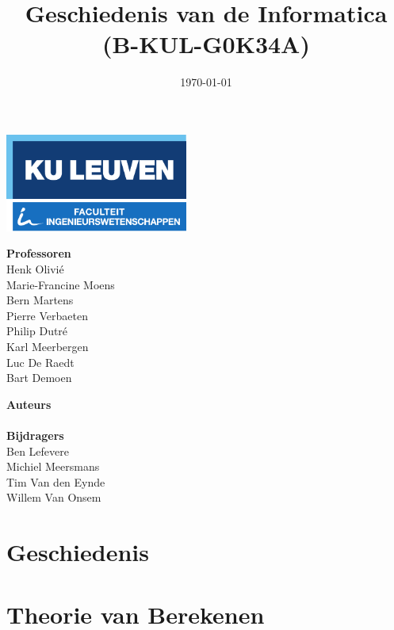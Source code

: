 \documentclass[11pt]{article}
\title{Geschiedenis van de Informatica \\ (B-KUL-G0K34A)}
\date{\today}
\author{\theauthors}
\newcommand{\thecontributors}{Ben Lefevere \\ Michiel Meersmans \\ Tim Van den Eynde \\  Willem Van Onsem }
\newcommand{\theprofs}{Henk Olivi\'e \\ Marie-Francine Moens \\ Bern Martens \\ Pierre Verbaeten \\ Philip Dutr\'e \\ Karl Meerbergen \\ Luc De Raedt \\ Bart Demoen}
\theoremstyle{definition}
\begin{document}

\begin{titlepage}

\thispagestyle{empty}

\begin{minipage}{\textwidth}
	\includegraphics[width=60mm]{logokuleng.pdf}
\end{minipage}

\vspace{40mm}

\begin{minipage}{\textwidth}
	\Huge
	\sffamily
	\thetitle
\end{minipage}

\vspace{50mm}

\hfill
\begin{minipage}[t]{0.5\textwidth}
	\Large
	\sffamily
	\textbf{Professoren} \\
	\theprofs
\end{minipage}%
\begin{minipage}[t]{0.5\textwidth}
\begin{flushright}
	\Large
	\sffamily
	\textbf{Auteurs} \\
	\theauthor
	\vspace{10mm} \\
	\textbf{Bijdragers} \\
	\thecontributors
\end{flushright}
\end{minipage}
\vfill
\end{titlepage}

\newpage

\tableofcontents

\newpage

\section{Geschiedenis}



\newpage

\section{Theorie van Berekenen}

\newpage
\end{document}
